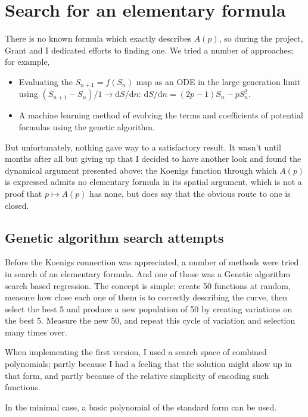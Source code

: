 \documentclass[11pt]{article}
\begin{document}
\section{Search for an elementary formula}
\label{sec:search}

There is no known formula which exactly describes $A(p)$, so during the project, Grant and I dedicated efforts
to finding one. We tried a number of approaches; for example, 

\begin{itemize}
    \item Evaluating the $S_{n+1} = f(S_n)$ map as an ODE in the large generation limit using $(S_{n+1} - S_n)/1 \to \mathrm{d}S / \mathrm{d} n$: $\mathrm{d}S / \mathrm{d} n = (2p-1)S_n - pS_{n}^2$.
    \item A machine learning method of evolving the terms and coefficients of potential formulas using the genetic algorithm.
\end{itemize}
But unfortunately, nothing gave way to a satisfactory result. It wasn't until months after all but giving up that I decided to have another look and found the dynamical argument presented above: the Koenigs function through which $A(p)$ is expressed admits no elementary formula in its spatial argument, which is not a proof that $p\mapsto A(p)$ has none, but does say that the obvious route to one is closed.

\subsection{Genetic algorithm search attempts}

Before the Koenigs connection was appreciated, a number of methods were tried in search of an elementary formula. 
And one of those was a Genetic algorithm search based regression. The concept is simple: create
50 functions at random, measure how close each one of them is to correctly describing the curve,
then select the best 5 and produce a new population of 50 by creating variations on the best 5. 
Measure the new 50, and repeat this cycle of variation and selection many times over.

When implementing the first version, I used a search space of combined polynomials; partly because I 
had a feeling that the solution might show up in that form, and partly because of the relative simplicity
of encoding such functions. 

In the minimal case, a basic polynomial of the standard form can be used. 
\end{document}
